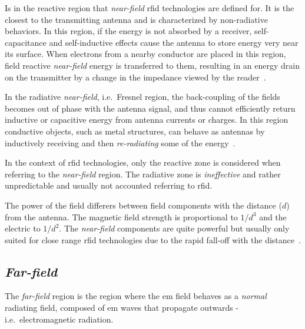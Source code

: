 
Is in the reactive region that \emph{near-field} \ac{rfid} technologies are defined for. It is the closest to the transmitting antenna and is characterized by non-radiative behaviors. In this region, if the energy is not absorbed by a receiver, self-capacitance and self-inductive effects cause the antenna to store energy very near its surface. When electrons from a nearby conductor are placed in this region, field reactive \emph{near-field} energy is transferred to them, resulting in an energy drain on the transmitter by a change in the impedance viewed by the reader~\cite{finkenzellerRFIDHandbookFundamentals2003, balanisAntennaTheoryAnalysis2005}.

In the radiative \emph{near-field}, i.e.\ Fresnel region, the back-coupling of the fields becomes out of phase with the antenna signal, and thus cannot efficiently return inductive or capacitive energy from antenna currents or charges.
In this region conductive objects, such as metal structures, can behave as antennas by inductively receiving and then \emph{re-radiating} some of the energy~\cite{ElectromagneticRadiationField}.

In the context of \ac{rfid} technologies, only the reactive zone is considered when referring to the \emph{near-field} region. The radiative zone is \textit{ineffective} and rather unpredictable and usually not accounted referring to \ac{rfid}.

The power of the field differers between field components with the distance ($d$) from the antenna. The magnetic field strength is proportional to $1/d^3$ and the electric to $1/d^2$. The \emph{near-field} components are quite powerful but usually only suited for close range \ac{rfid} technologies due to the rapid fall-off with the distance~\cite{balanisAntennaTheoryAnalysis2005}.

\subsection{\emph{Far-field}}

The \emph{far-field} region is the region where the \ac{em} field behaves as a \textit{normal} radiating field, composed of \ac{em} waves that propagate outwards - i.e.\ electromagnetic radiation.

